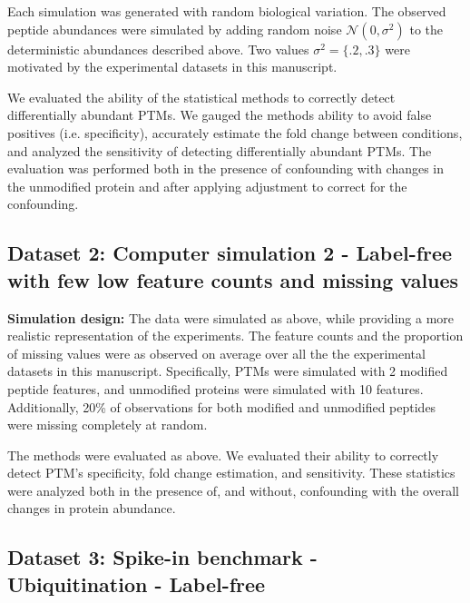 \documentclass[mcp]{article}
\numberwithin{table}{section}
\begin{document}
Each simulation was generated with random biological variation. The observed peptide abundances were simulated by adding random noise $\mathcal{N}(0,\sigma^2)$ to the deterministic abundances described above. Two values $\sigma^2 = \{.2, .3\}$ were motivated by the experimental datasets in this manuscript.

\medskip {} We evaluated the ability of the statistical methods to correctly detect differentially abundant PTMs. We gauged the methods ability to avoid false positives (i.e. specificity), accurately estimate the fold change between conditions, and analyzed the sensitivity of detecting differentially abundant PTMs. The evaluation was performed both in the presence of confounding with changes in the unmodified protein and after applying adjustment to correct for the confounding.

\subsection*{Dataset 2: Computer simulation 2 - Label-free with few low feature counts and missing values}
\label{sec:comp_sim_procedure2}

{\bf Simulation design:} The data were simulated as above, while providing a more realistic representation of the experiments. The feature counts and the proportion of missing values were as observed on average over all the the experimental datasets in this manuscript. Specifically, PTMs were simulated with 2 modified peptide features, and unmodified proteins were simulated with 10 features. Additionally, 20\% of observations for both modified and unmodified peptides were missing completely at random.

\medskip {} The methods were evaluated as above. We evaluated their ability to correctly detect PTM's specificity, fold change estimation, and sensitivity. These statistics were analyzed both in the presence of, and without, confounding with the overall changes in protein abundance.
 
\subsection*{Dataset 3: Spike-in benchmark - Ubiquitination - Label-free}
\label{sec:exp_proc_dataset3}
\end{document}
